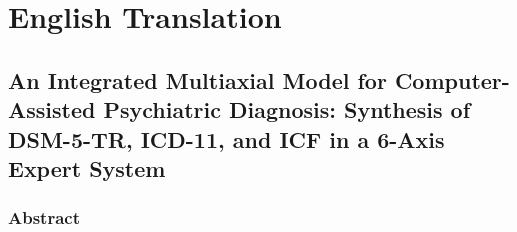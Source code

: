 \documentclass[11pt,a4paper]{article}
\begin{document}
\section*{English Translation}

\subsection*{An Integrated Multiaxial Model for Computer-Assisted Psychiatric Diagnosis: Synthesis of DSM-5-TR, ICD-11, and ICF in a 6-Axis Expert System}

\subsubsection*{Abstract}
\end{document}
